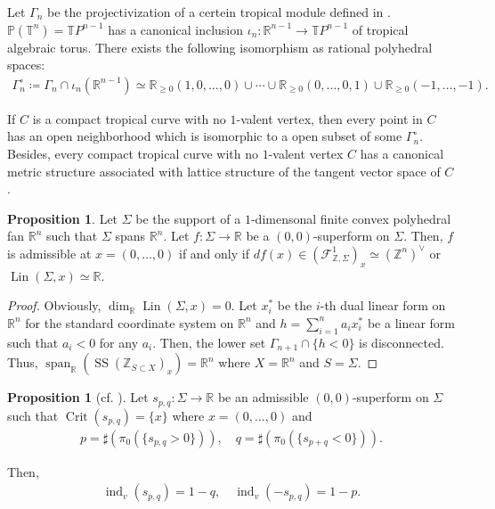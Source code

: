 \documentclass[a4paper,dvipdfmx,reqno,12pt]{amsart}
\theoremstyle{definition}
\newtheorem{proposition}[theorem]{Proposition}
\newcommand{\deq}{\coloneqq}
\newcommand{\opn}[1]{\operatorname{#1}}
\numberwithin{equation}{section}
\begin{document}
Let $\Gamma_{n}$ be the projectivization of 
a certein tropical module defined in 
\cite[2.2]{mikhalkinTropicalCurvesTheir2008a}.
$\mathbb{P}(\mathbb{T}^{n})=\mathbb{T}P^{n-1}$ has a canonical inclusion
$\iota_n\colon \mathbb{R}^{n-1}\to 
\mathbb{T}P^{n-1}$ 
of tropical algebraic torus.
There exists the following isomorphism as rational 
polyhedral spaces:
\begin{align}
\Gamma_{n}^{\circ}\deq \Gamma_{n}\cap \iota_n(\mathbb{R}^{n-1}) \simeq \mathbb{R}_{\geq 0}(1,0,\ldots,0)\cup \cdots
\cup {\mathbb{R}}_{\geq 0}(0,\ldots,0,1)\cup 
{\mathbb{R}}_{\geq 0}(-1,\ldots,-1).
\end{align}

If $C$ is a compact tropical curve with 
no $1$-valent vertex, then every point in $C$ has 
an open neighborhood which is isomorphic to 
a open subset of some $\Gamma_{n}^{\circ}$.
Besides, every compact tropical curve with 
no $1$-valent vertex $C$ has a canonical metric structure 
associated with lattice structure of the tangent 
vector space of $C$ 
\cite[Proposition 3.6]{mikhalkinTropicalCurvesTheir2008a}.


\begin{proposition}
\label{proposition-admissible-curve}
Let $\Sigma$ be the support of a $1$-dimensonal 
finite convex polyhedral fan $\mathbb{R}^{n}$ such that
$\Sigma$ spans $\mathbb{R}^{n}$.
Let $f\colon \Sigma\to \mathbb{R}$ be a 
$(0,0)$-superform on $\Sigma$. Then, 
$f$ is admissible at $x=(0,\ldots,0)$ if and only if 
$df(x)\in (\mathcal{F}^{1}_{\mathbb{Z},\Sigma})_x\simeq (\mathbb{Z}^{n})^{\vee}$
or $\opn{Lin}(\Sigma,x)\simeq \mathbb{R}$.

\end{proposition}

\begin{proof}
Obviously, $\opn{dim}_{\mathbb{R}}\opn{Lin}(\Sigma,x)=0$.
Let $x_i^{*}$ be the $i$-th dual linear form on 
$\mathbb{R}^{n}$ for the standard coordinate system on 
$\mathbb{R}^{n}$ and 
$h=\sum_{i=1}^{n} a_i x^{*}_i$ be a linear form
such that $a_i<0$ for any $a_i$.
Then, the lower set $\Gamma_{n+1}\cap \{h< 0\}$ is disconnected.
Thus, 
$\opn{span}_{\mathbb{R}}(\opn{SS}(\mathbb{Z}_{S\subset X})_x)
=\mathbb{R}^{n}$ where $X=\mathbb{R}^{n}$ and $S=\Sigma$.
\end{proof}



\begin{proposition}[{cf. \cite{knill2012graph}}]
\label{proposition-n-valent}
Let $s_{p,q}\colon \Sigma\to \mathbb{R}$ be 
an admissible $(0,0)$-superform on $\Sigma$ 
such that $\opn{Crit}(s_{p,q})=\{x\}$ where
$x=(0,\ldots,0)$ and
\begin{align}
p=\sharp(\pi_0(\{s_{p,q}>0\})), \quad 
q=\sharp(\pi_0(\{s_{p+q}<0\})).
\end{align}

Then, 
\begin{align}
\opn{ind}_v(s_{p,q})=1-q ,\quad \opn{ind}_v(-s_{p,q})=1-p.
\end{align}

\end{proposition}
\end{document}
